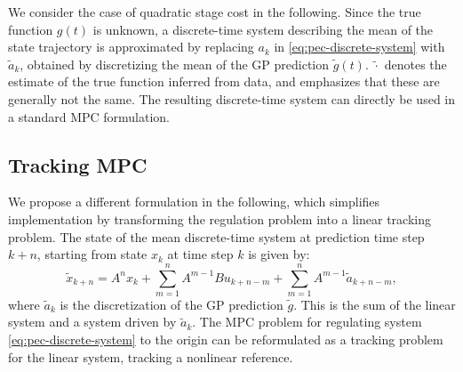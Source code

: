 We consider the case of quadratic stage cost in the following. Since the true
function $g(t)$ is unknown, a discrete-time system describing the mean of the
state trajectory is approximated by replacing $a_k$ in
\eqref{eq:pec-discrete-system} with $\tilde a_k$, obtained by discretizing the
mean of the GP prediction $\tilde g(t)$. $\tilde{\cdot}$
denotes the estimate of the true function inferred from data, and emphasizes
that these are generally not the same. The resulting discrete-time system can
directly be used in a standard MPC formulation.

\subsection{Tracking MPC}
\label{sec:tracking_mpc}

We propose a different formulation in the following, which simplifies
implementation by transforming the regulation problem into a linear tracking
problem. The state of the mean discrete-time system at prediction time step
$k+n$, starting from state $x_k$ at time step $k$ is given by:
\begin{equation}
\label{eq:state-evolution}
  \tilde x_{k+n} = A^n x_k + \sum_{m=1}^{n} A^{m-1} B u_{k+n-m} +
\sum_{m=1}^{n} A^{m-1} \tilde a_{k+n-m},
\end{equation}
where $\tilde a_k$ is the discretization of the GP prediction
$\tilde g$. This is the sum of the linear system and a system driven by
$\tilde a_k$. The MPC problem for regulating system
\eqref{eq:pec-discrete-system} to the origin can be reformulated as a tracking
problem for the linear system, tracking a nonlinear reference.

